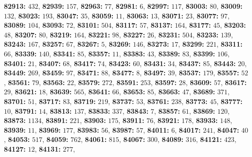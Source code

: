 \textsf{\bfseries 82913:} $432$, \textsf{\bfseries 82939:} $157$, \textsf{\bfseries 82963:} $77$, \textsf{\bfseries 82981:} $6$, \textsf{\bfseries 82997:} $117$, \textsf{\bfseries 83003:} $80$, \textsf{\bfseries 83009:} $132$, \textsf{\bfseries 83023:} $193$, \textsf{\bfseries 83047:} $35$, \textsf{\bfseries 83059:} $11$, \textsf{\bfseries 83063:} $13$, \textsf{\bfseries 83071:} $23$, \textsf{\bfseries 83077:} $97$, \textsf{\bfseries 83089:} $104$, \textsf{\bfseries 83093:} $72$, \textsf{\bfseries 83101:} $504$, \textsf{\bfseries 83117:} $57$, \textsf{\bfseries 83137:} $164$, \textsf{\bfseries 83177:} $45$, \textsf{\bfseries 83203:} $48$, \textsf{\bfseries 83207:} $80$, \textsf{\bfseries 83219:} $164$, \textsf{\bfseries 83221:} $98$, \textsf{\bfseries 83227:} $26$, \textsf{\bfseries 83231:} $504$, \textsf{\bfseries 83233:} $139$, \textsf{\bfseries 83243:} $167$, \textsf{\bfseries 83257:} $67$, \textsf{\bfseries 83267:} $5$, \textsf{\bfseries 83269:} $146$, \textsf{\bfseries 83273:} $17$, \textsf{\bfseries 83299:} $221$, \textsf{\bfseries 83311:} $66$, \textsf{\bfseries 83339:} $140$, \textsf{\bfseries 83341:} $85$, \textsf{\bfseries 83357:} $11$, \textsf{\bfseries 83383:} $43$, \textsf{\bfseries 83389:} $83$, \textsf{\bfseries 83399:} $106$, \textsf{\bfseries 83401:} $21$, \textsf{\bfseries 83407:} $68$, \textsf{\bfseries 83417:} $74$, \textsf{\bfseries 83423:} $60$, \textsf{\bfseries 83431:} $34$, \textsf{\bfseries 83437:} $85$, \textsf{\bfseries 83443:} $20$, \textsf{\bfseries 83449:} $269$, \textsf{\bfseries 83459:} $97$, \textsf{\bfseries 83471:} $88$, \textsf{\bfseries 83477:} $8$, \textsf{\bfseries 83497:} $39$, \textsf{\bfseries 83537:} $179$, \textsf{\bfseries 83557:} $52$, \textsf{\bfseries 83561:} $79$, \textsf{\bfseries 83563:} $22$, \textsf{\bfseries 83579:} $272$, \textsf{\bfseries 83591:} $253$, \textsf{\bfseries 83597:} $28$, \textsf{\bfseries 83609:} $57$, \textsf{\bfseries 83617:} $29$, \textsf{\bfseries 83621:} $18$, \textsf{\bfseries 83639:} $565$, \textsf{\bfseries 83641:} $66$, \textsf{\bfseries 83653:} $85$, \textsf{\bfseries 83663:} $47$, \textsf{\bfseries 83689:} $371$, \textsf{\bfseries 83701:} $51$, \textsf{\bfseries 83717:} $83$, \textsf{\bfseries 83719:} $219$, \textsf{\bfseries 83737:} $53$, \textsf{\bfseries 83761:} $238$, \textsf{\bfseries 83773:} $45$, \textsf{\bfseries 83777:} $10$, \textsf{\bfseries 83791:} $14$, \textsf{\bfseries 83813:} $137$, \textsf{\bfseries 83833:} $337$, \textsf{\bfseries 83843:} $7$, \textsf{\bfseries 83857:} $61$, \textsf{\bfseries 83869:} $120$, \textsf{\bfseries 83873:} $1134$, \textsf{\bfseries 83891:} $221$, \textsf{\bfseries 83903:} $175$, \textsf{\bfseries 83911:} $76$, \textsf{\bfseries 83921:} $178$, \textsf{\bfseries 83933:} $148$, \textsf{\bfseries 83939:} $11$, \textsf{\bfseries 83969:} $177$, \textsf{\bfseries 83983:} $56$, \textsf{\bfseries 83987:} $57$, \textsf{\bfseries 84011:} $6$, \textsf{\bfseries 84017:} $241$, \textsf{\bfseries 84047:} $40$, \textsf{\bfseries 84053:} $517$, \textsf{\bfseries 84059:} $762$, \textsf{\bfseries 84061:} $815$, \textsf{\bfseries 84067:} $300$, \textsf{\bfseries 84089:} $316$, \textsf{\bfseries 84121:} $423$, \textsf{\bfseries 84127:} $12$, \textsf{\bfseries 84131:} $277$, 
